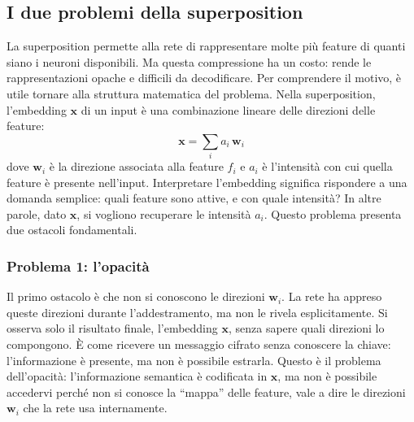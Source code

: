 \subsection{I due problemi della superposition}
\label{subsec:due_problemi}
La superposition permette alla rete di rappresentare molte più feature di quanti siano i neuroni disponibili. Ma questa compressione ha un costo: rende le rappresentazioni opache e difficili da decodificare.
Per comprendere il motivo, è utile tornare alla struttura matematica del problema. Nella superposition, l'embedding $\mathbf{x}$ di un input è una combinazione lineare delle direzioni delle feature:
\begin{equation}
    \mathbf{x} = \sum_i a_i \, \mathbf{w}_i
    \label{eq:linear_superposition}
\end{equation}
dove $\mathbf{w}_i$ è la direzione associata alla feature $f_i$ e $a_i$ è l'intensità con cui quella feature è presente nell'input.
Interpretare l'embedding significa rispondere a una domanda semplice: quali feature sono attive, e con quale intensità? In altre parole, dato $\mathbf{x}$, si vogliono recuperare le intensità $a_i$.
Questo problema presenta due ostacoli fondamentali.
\subsubsection{Problema 1: l'opacità}
Il primo ostacolo è che non si conoscono le direzioni $\mathbf{w}_i$.
La rete ha appreso queste direzioni durante l'addestramento, ma non le rivela esplicitamente. Si osserva solo il risultato finale, l'embedding $\mathbf{x}$, senza sapere quali direzioni lo compongono. È come ricevere un messaggio cifrato senza conoscere la chiave: l'informazione è presente, ma non è possibile estrarla.
Questo è il problema dell'opacità: l'informazione semantica è codificata in $\mathbf{x}$, ma non è possibile accedervi perché non si conosce la ``mappa'' delle feature, vale a dire le direzioni $\mathbf{w}_i$ che la rete usa internamente.
